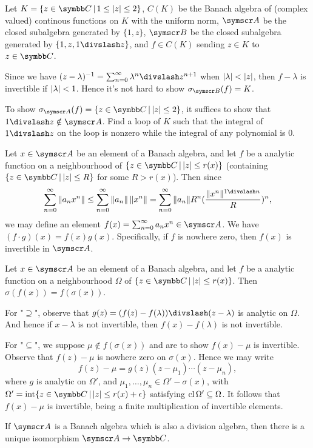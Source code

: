 \begin{example}
  Let $K = \{z\in\CC\VERT 1\leq\ABS{z}\leq 2\}$, $C(K)$ be the Banach algebra of (complex valued) continous functions on $K$ with the uniform norm, $\BA A$ be the closed subalgebra generated by $\{1, z\}$, $\BA B$ be the closed subalgebra generated by $\{1, z, 1\DIV z\}$, and $f\in C(K)$ sending $z\in K$ to $z\in\CC$.

  Since we have $(z-\lambda)^{-1}=\sum_{n=0}^\infty \lambda^n\DIV z^{n+1}$ when $\vert\lambda\vert<\vert z\vert$, then $f-\lambda$ is invertible if $\vert\lambda\vert < 1$. Hence it's not hard to show $\sigma_{\BA B}(f)=K$.

  To show $\sigma_{\BA A}(f)=\{z\in\CC\VERT \ABS{z}\leq 2\}$, it suffices to show that $1\DIV z\notin \BA A$. Find a loop of $K$ such that the integral of $1\DIV z$ on the loop is nonzero while the integral of any polynomial is 0.
\end{example}

Let $x\in \BA A$ be an element of a Banach algebra, and let $f$ be a analytic function on a neighbourhood of $\{z\in\CC\VERT \ABS{z}\leq r(x)\}$ (containing $\{z\in\CC\VERT \ABS{z}\leq R\}$ for some $R>r(x)$). Then since
\begin{equation*}
  \sum_{n=0}^\infty \NORM{a_nx^n}\leq\sum_{n=0}^\infty\NORM{a_n}\,\NORM{x^n}=\sum_{n=0}^\infty \NORM{a_n}R^n(\frac{\NORM{x^n}^{1\DIV n}}{R})^n,
\end{equation*}
we may define an element $f(x)=\sum_{n=0}^\infty a_nx^n\in \BA A$. We have $(f\cdot g)(x)=f(x)g(x)$. Specifically, if $f$ is nowhere zero, then $f(x)$ is invertible in $\BA A$.

\begin{theorem}
  Let $x\in \BA A$ be an element of a Banach algebra, and let $f$ be a analytic function on a neighbourhood $\Omega$ of $\{z\in\CC\VERT \ABS{z}\leq r(x)\}$. Then $\sigma(f(x))=f(\sigma(x))$.
\end{theorem}

\begin{hint}
  For "$\supseteq$", observe that $g(z)=(f(z)-f(\lambda))\DIV (z-\lambda)$ is analytic on $\Omega$. And hence if $x-\lambda$ is not invertible, then $f(x)-f(\lambda)$ is not invertible.

  For "$\subseteq$", we suppose $\mu\notin f(\sigma(x))$ and are to show $f(x)-\mu$ is invertible. Observe that $f(z)-\mu$ is nowhere zero on $\sigma(x)$. Hence we may write
  \begin{equation*}
    f(z)-\mu=g(z)(z-\mu_1)\dotsb(z-\mu_n),
  \end{equation*}
  where $g$ is analytic on $\Omega'$, and $\mu_1, \dotsc, \mu_n\in\Omega'-\sigma(x)$, with $\Omega'=\INT \{z\in\CC\VERT \ABS{z}\leq r(x)+\epsilon\}$ satisfying $\operatorname{cl}\Omega'\subseteq\Omega$. It follows that $f(x)-\mu$ is invertible, being a finite multiplication of invertible elements.
\end{hint}

\begin{theorem}
  If $\BA A$ is a Banach algebra which is also a division algebra, then there is a unique isomorphism $\BA A\to \CC$.
\end{theorem}
